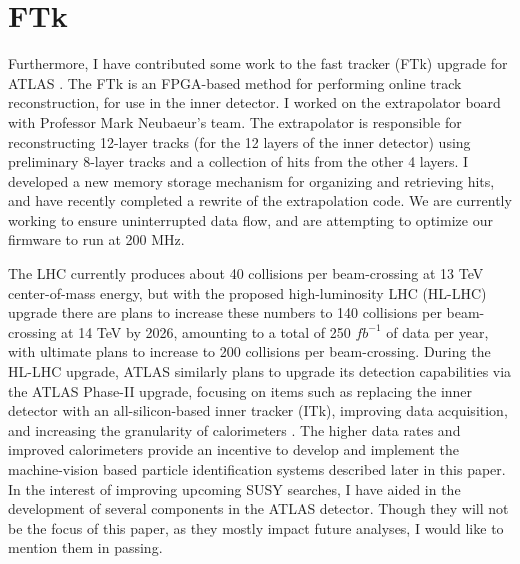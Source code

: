 \chapter{FTk}

Furthermore, I have contributed some work to the fast tracker (FTk) upgrade for ATLAS \cite{FTk}. The FTk is an FPGA-based method for performing online track reconstruction, for use in the inner detector. I worked on the extrapolator board with Professor Mark Neubaeur's team. The extrapolator is responsible for reconstructing 12-layer tracks (for the 12 layers of the inner detector) using preliminary 8-layer tracks and a collection of hits from the other 4 layers. I developed a new memory storage mechanism for organizing and retrieving hits, and have recently completed a rewrite of the extrapolation code. We are currently working to ensure uninterrupted data flow, and are attempting to optimize our firmware to run at 200 MHz.


The LHC currently produces about 40 collisions per beam-crossing at 13 TeV center-of-mass energy, but with the proposed high-luminosity LHC (HL-LHC) upgrade there are plans to increase these numbers to 140 collisions per beam-crossing at 14 TeV by 2026, amounting to a total of 250 $fb^{-1}$ of data per year, with ultimate plans to increase to 200 collisions per beam-crossing. During the HL-LHC upgrade, ATLAS similarly plans to upgrade its detection capabilities via the ATLAS Phase-II upgrade, focusing on items such as replacing the inner detector with an all-silicon-based inner tracker (ITk), improving data acquisition, and increasing the granularity of calorimeters \cite{ATLAS_phaseII}. The higher data rates and improved calorimeters provide an incentive to develop and implement the machine-vision based particle identification systems described later in this paper. In the interest of improving upcoming SUSY searches, I have aided in the development of several components in the ATLAS detector. Though they will not be the focus of this paper, as they mostly impact future analyses, I would like to mention them in passing.

